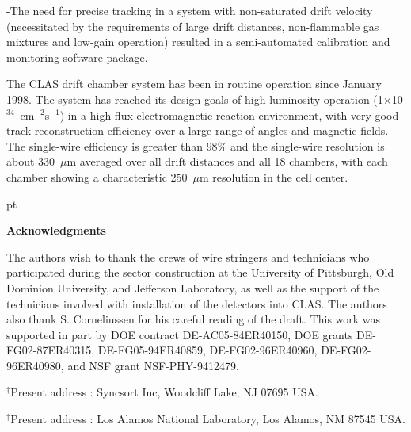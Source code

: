 \noindent
-The need for precise tracking in a system with non-saturated drift velocity 
(necessitated by the requirements of large drift distances, non-flammable gas mixtures 
and low-gain operation) resulted in a semi-automated calibration and monitoring software 
package.

\vskip 10pt
The CLAS drift chamber system has been in routine operation since January 1998. 
The system has reached its design goals of 
high-luminosity operation (1$\times$10$^{34}$~cm$^{-2}$s$^{-1}$) in a 
high-flux electromagnetic reaction environment, with very good track 
reconstruction efficiency over a large range of angles and 
magnetic fields.  The single-wire efficiency is greater than $98\%$ and the
single-wire resolution is about 330~$\mu$m averaged over all drift distances and
all 18 chambers, with each chamber showing a characteristic 250~$\mu$m resolution 
in the cell center.

 pt

{\large{\bf Acknowledgments}}

\vskip 10pt

The authors wish to thank the crews of wire stringers and technicians who 
participated during the sector construction at the University of Pittsburgh,
Old Dominion University, and Jefferson Laboratory, as well as the support of 
the technicians involved with installation of the detectors into CLAS.  The
authors also thank S. Corneliussen for his careful reading of the draft.  This
work was supported in part by DOE contract DE-AC05-84ER40150, DOE grants 
DE-FG02-87ER40315, DE-FG05-94ER40859, DE-FG02-96ER40960, DE-FG02-96ER40980, 
and NSF grant NSF-PHY-9412479.

\vskip 10pt

\noindent
$^{\dagger}$Present address : Syncsort Inc, Woodcliff Lake, NJ 07695 USA.

\noindent
$^{\ddagger}$Present address : Los Alamos National Laboratory, Los Alamos, NM
87545 USA.


